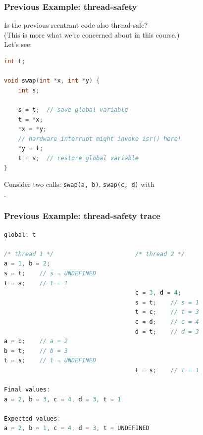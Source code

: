\begin{frame}[fragile]
  \frametitle{Previous Example: thread-safety}

  
  Is the previous reentrant code also thread-safe?\\

  (This is more what we're concerned about in this course.)\\[1em]

  Let's see:
  \begin{lstlisting}[language=C]
int t;

void swap(int *x, int *y) {
    int s;
 
    s = t;  // save global variable
    t = *x;
    *x = *y;
    // hardware interrupt might invoke isr() here!
    *y = t;
    t = s;  // restore global variable
}
  \end{lstlisting}
  
  Consider two calls: {\tt swap(a, b)}, {\tt swap(c, d)} with\\
  .
  
\end{frame}

\begin{frame}[fragile]
  \frametitle{Previous Example: thread-safety trace}

  
  \begin{lstlisting}[language=C]
global: t

/* thread 1 */                       /* thread 2 */
a = 1, b = 2;
s = t;    // s = UNDEFINED
t = a;    // t = 1
                                     c = 3, d = 4;
                                     s = t;    // s = 1
                                     t = c;    // t = 3
                                     c = d;    // c = 4
                                     d = t;    // d = 3
a = b;    // a = 2
b = t;    // b = 3
t = s;    // t = UNDEFINED
                                     t = s;    // t = 1

Final values:
a = 2, b = 3, c = 4, d = 3, t = 1

Expected values:
a = 2, b = 1, c = 4, d = 3, t = UNDEFINED
  \end{lstlisting}
  
\end{frame}

